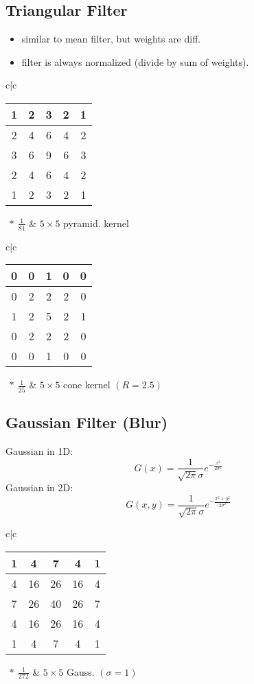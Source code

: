 \subsection{Triangular Filter}
\begin{itemize}
  \item similar to mean filter, but weights are diff.
  \item filter is always normalized (divide by sum of weights).
\end{itemize}
\begin{tabular}{c|c}
  \begin{tabular}{|c|c|c|c|c|}
  \hline
  1 & 2 & 3 & 2 & 1\\
  \hline
  2 & 4 & 6 & 4 & 2\\
  \hline
  3 & 6 & 9 & 6 & 3\\
  \hline
  2 & 4 & 6 & 4 & 2\\
  \hline
  1 & 2 & 3 & 2 & 1\\
  \hline
  \end{tabular}$\ *\ \frac{1}{81}$
  &  $5 \times 5$ pyramid. kernel
\end{tabular}
\begin{tabular}{c|c}
  \begin{tabular}{|c|c|c|c|c|}
  \hline
  0 & 0 & 1 & 0 & 0\\
  \hline
  0 & 2 & 2 & 2 & 0\\
  \hline
  1 & 2 & 5 & 2 & 1\\
  \hline
  0 & 2 & 2 & 2 & 0\\
  \hline
  0 & 0 & 1 & 0 & 0\\
  \hline
  \end{tabular}$\ *\ \frac{1}{25}$
  &  $5 \times 5$ cone kernel $(R=2.5)$
\end{tabular}

\subsection{Gaussian Filter (Blur)}
Gaussian in 1D:
\[
  G(x) = \frac{1}{\sqrt{2\pi}\sigma}e^{-\frac{x^2}{2\sigma^{2}}}
\]
Gaussian in 2D:
\[
  G(x,y) = \frac{1}{\sqrt{2\pi}\sigma}e^{-\frac{x^2+y^2}{2\sigma^{2}}}
\]
\begin{tabular}{c|c}
  \begin{tabular}{|c|c|c|c|c|}
  \hline
  1 & 4 & 7 & 4 & 1\\
  \hline
  4 & 16 & 26 & 16 & 4\\
  \hline
  7 & 26 & 40 & 26 & 7\\
  \hline
  4 & 16 & 26 & 16 & 4\\
  \hline
  1 & 4 & 7 & 4 & 1\\
  \hline
  \end{tabular}$\ *\ \frac{1}{272}$
  &  $5 \times 5$ Gauss. $(\sigma = 1)$
\end{tabular}

